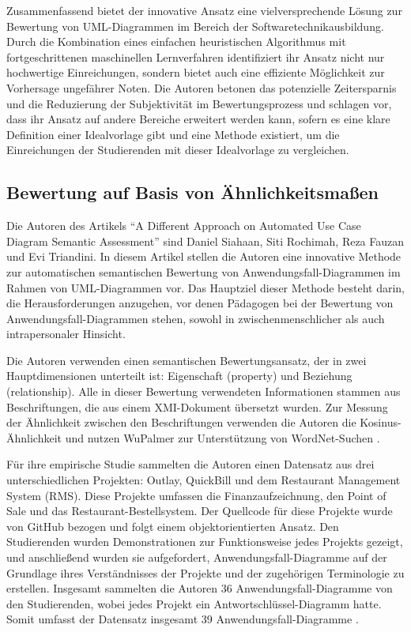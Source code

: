 Zusammenfassend bietet der innovative Ansatz eine vielversprechende Lösung zur Bewertung von UML-Diagrammen im Bereich der Softwaretechnikausbildung. Durch die Kombination eines einfachen heuristischen Algorithmus mit fortgeschrittenen maschinellen Lernverfahren identifiziert ihr Ansatz nicht nur hochwertige Einreichungen, sondern bietet auch eine effiziente Möglichkeit zur Vorhersage ungefährer Noten. Die Autoren betonen das potenzielle Zeitersparnis und die Reduzierung der Subjektivität im Bewertungsprozess und schlagen vor, dass ihr Ansatz auf andere Bereiche erweitert werden kann, sofern es eine klare Definition einer Idealvorlage gibt und eine Methode existiert, um die Einreichungen der Studierenden mit dieser Idealvorlage zu vergleichen.


\subsection{Bewertung auf Basis von Ähnlichkeitsmaßen}

Die Autoren des Artikels ``A Different Approach on Automated Use Case Diagram Semantic Assessment'' \cite{fauzan2021different} sind Daniel Siahaan, Siti Rochimah, Reza Fauzan und Evi Triandini. In diesem Artikel stellen die Autoren eine innovative Methode zur automatischen semantischen Bewertung von Anwendungsfall-Diagrammen im Rahmen von UML-Diagrammen vor. Das Hauptziel dieser Methode besteht darin, die Herausforderungen anzugehen, vor denen Pädagogen bei der Bewertung von Anwendungsfall-Diagrammen stehen, sowohl in zwischenmenschlicher als auch intrapersonaler Hinsicht.

Die Autoren verwenden einen semantischen Bewertungsansatz, der in zwei Hauptdimensionen unterteilt ist: Eigenschaft (property) und Beziehung (relationship). Alle in dieser Bewertung verwendeten Informationen stammen aus Beschriftungen, die aus einem \ac{XMI}-Dokument \cite{xmi} übersetzt wurden. Zur Messung der Ähnlichkeit zwischen den Beschriftungen verwenden die Autoren die Kosinus-Ähnlichkeit und nutzen WuPalmer zur Unterstützung von WordNet-Suchen \cite{fauzan2021different}.

Für ihre empirische Studie sammelten die Autoren einen Datensatz aus drei unterschiedlichen Projekten: Outlay, QuickBill und dem Restaurant Management System (RMS). Diese Projekte umfassen die Finanzaufzeichnung, den Point of Sale und das Restaurant-Bestellsystem. Der Quellcode für diese Projekte wurde von GitHub bezogen und folgt einem objektorientierten Ansatz. Den Studierenden wurden Demonstrationen zur Funktionsweise jedes Projekts gezeigt, und anschließend wurden sie aufgefordert, Anwendungsfall-Diagramme auf der Grundlage ihres Verständnisses der Projekte und der zugehörigen Terminologie zu erstellen. Insgesamt sammelten die Autoren 36 Anwendungsfall-Diagramme von den Studierenden, wobei jedes Projekt ein Antwortschlüssel-Diagramm hatte. Somit umfasst der Datensatz insgesamt 39 Anwendungsfall-Diagramme \cite{fauzan2021different}.

